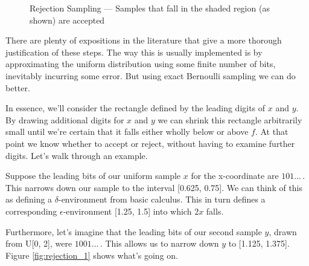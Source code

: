 \begin{figure}
    \centering
    \caption{Rejection Sampling --- Samples that fall in the shaded region (as shown) are accepted}
    \label{fig:rejection_0}
\end{figure}

There are plenty of expositions in the literature that give a more thorough justification of these steps. The way this is usually implemented is by approximating the uniform distribution using some finite number of bits, inevitably incurring some error. But using exact Bernoulli sampling we can do better.

In essence, we'll consider the rectangle defined by the leading digits of $x$ and $y$. By drawing additional digits for $x$ and $y$ we can shrink this rectangle arbitrarily small until we're certain that it falls either wholly below or above $f$. At that point we know whether to accept or reject, without having to examine further digits. Let's walk through an example.

Suppose the leading bits of our uniform sample $x$ for the x-coordinate are $101...\,.$ This narrows down our sample to the interval [0.625, 0.75]. We can think of this as defining a $\delta$-environment from basic calculus. This in turn defines a corresponding $\epsilon$-environment [1.25, 1.5] into which $2x$ falls.

Furthermore, let's imagine that the leading bits of our second sample $y$, drawn from U[0, 2], were $1001...\,.$ This allows us to narrow down $y$ to [1.125, 1.375]. Figure \ref{fig:rejection_1} shows what's going on.

